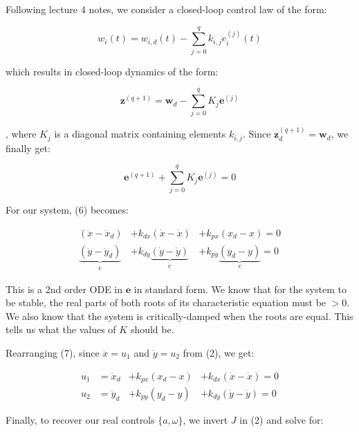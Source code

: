 \documentclass{article}
\begin{document}
\begin{enumerate}[label=(\roman*)]
	Following lecture 4 notes, we consider a closed-loop control law of the form:
	
	\begin{equation}
	w_i(t) = w_{i,d}(t) - \sum_{j=0}^q k_{i,j}e_i^{(j)}(t)
	\end{equation}
	
	which results in closed-loop dynamics of the form:
	
	\begin{equation}
	\bm{z}^{(q+1)} = \bm{w}_d - \sum_{j=0}^q K_j \bm{e}^{(j)}
	\end{equation}
	
	, where $K_j$ is a diagonal matrix containing elements $k_{i,j}$. Since $\bm{z}_d^{(q+1)}=\bm{w}_d$, we finally get:
	
	\begin{equation}
	\bm{e}^{(q+1)} + \sum_{j=0}^q K_j \bm{e}^{(j)} = 0
	\end{equation}
	
	For our system, (6) becomes:
	
	\begin{equation}
	\begin{aligned}
	(\ddot{x}-\ddot{x}_d) &+ k_{dx}(\dot{x} - \dot{x}) &+ k_{px}(x_d - x) = 0 \\
	\underbrace{(\ddot{y}-\ddot{y}_d)}_{\ddot{e}} &+
	k_{dy}\underbrace{(\dot{y} - \dot{y})}_{\dot{e}} &+
	k_{py}\underbrace{(y_d - y)}_{e} = 0
	\end{aligned}
	\end{equation}
	
	This is a 2nd order ODE in $\bm{e}$ in standard form. We know that for the system to be stable, the real parts of both roots of its characteristic equation must be $>0$. We also know that the system is critically-damped when the roots are equal. This tells us what the values of $K$ should be.
	
	Rearranging (7), since $\ddot{x}=u_1$ and $\ddot{y}=u_2$ from (2), we get:
	
	\begin{equation}
	\begin{aligned}
	u_1 &= \ddot{x}_d &+ k_{px}(x_d - x) &+ k_{dx}(\dot{x} - \dot{x}) = 0 \\
	u_2 &= \ddot{y}_d &+ k_{py}(y_d - y) &+ k_{dy}(\dot{y} - \dot{y}) = 0
	\end{aligned}
	\end{equation}
	
	Finally, to recover our real controls $\{a, \omega\}$, we invert $J$ in (2) and solve for:


\end{enumerate}
\end{document}
